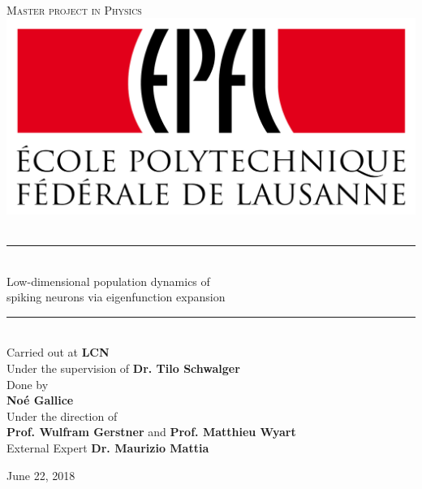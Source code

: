 \documentclass[12pt,twoside]{report}
\begin{document}
\newcommand{\HRule}{\rule{\linewidth}{0.5mm}}

\begin{titlepage}
\begin{center}

\vspace*{-3cm}


\\ [3mm]
\textsc{\large  Master project in Physics}\\[0.4cm]

\includegraphics[scale=0.07]{figures/epfl.png}~\\[0.5cm]


\HRule\\[0.4cm]
{ \Huge {Low-dimensional population dynamics of \\[1mm] spiking neurons via eigenfunction expansion} }\\[0.5cm] \HRule \\[2cm] 


{\large Carried out at \textbf{LCN}}\\[3mm]
{\large Under the supervision of \textbf{Dr. Tilo Schwalger}}\\[1.6cm]

{\Large Done by}\\[3mm]
{\Large \textbf{Noé Gallice}}\\[1.6cm]

{\large Under the direction of \\[3mm]
	\textbf{Prof. Wulfram Gerstner} and \textbf{
		Prof. Matthieu Wyart}}\\[1.6cm]


{\large External Expert \textbf{Dr. Maurizio Mattia}}

\vfill
{\large June 22, 2018}

\end{center}
\end{titlepage}
\end{document}
